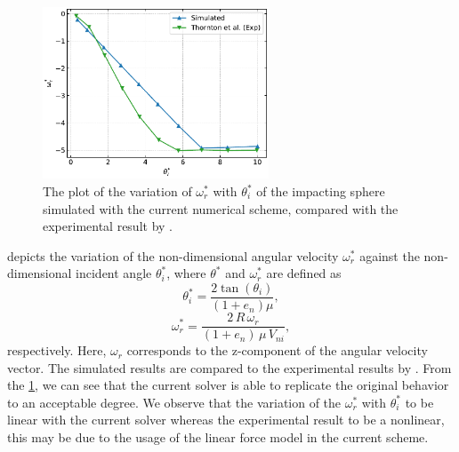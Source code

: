 \begin{figure}[!htpb]
  \centering
  \includegraphics[width=0.6\textwidth]{figures/csph/figures/vyas_2021_rebound_kinematics_3d/theta_vs_omega}
  \caption{The plot of the variation of $\omega^*_r$ with $\theta^*_i$ of the
    impacting sphere simulated with the current numerical scheme, compared
    with the experimental result by \textcite{thornton2011investigation}.}
\label{fig:results-sphere-impact-theta-vs-omega}
\end{figure}
 depicts the variation of the
non-dimensional angular velocity $\omega^*_r$ against the non-dimensional
incident angle $\theta^{*}_i$, where $\theta^{*}$ and $\omega^*_r$ are defined as
\begin{equation}
  \label{eq:non-dim-theta}
  \theta^{*}_i = \frac{2 \tan(\theta_i)}{(1 + e_n) \mu},
\end{equation}
\begin{equation}
  \label{eq:non-dim-omega}
  \omega^{*}_r = \frac{2\,R\,\omega_r}{(1 + e_n) \, \mu \, V_{ni}},
\end{equation}
respectively. Here, $\omega_r$ corresponds to the z-component of the angular
velocity vector. The simulated results are compared to the experimental
results by \textcite{thornton2011investigation}. From the
\cref{fig:results-sphere-impact-theta-vs-omega}, we can see that the current
solver is able to replicate the original behavior to an acceptable
degree. We observe that the variation of the $\omega^{*}_r$ with
$\theta^{*}_i$ to be linear with the current solver whereas the experimental
result to be a nonlinear, this may be due to the usage of the linear force model
in the current scheme.


\FloatBarrier%
